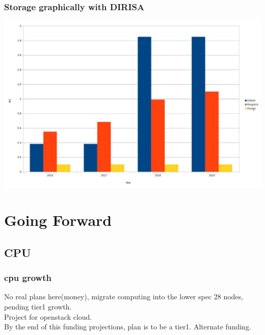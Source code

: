 \documentclass{beamer}
\begin{document}
\begin{frame}
    \frametitle{Storage graphically with DIRISA}
    \includegraphics[scale=0.25]{StoragePledge-WithDIRISA.jpg}
\end{frame}


\section{Going Forward}
\subsection{CPU}
\begin{frame}
    \frametitle{cpu growth}
    No real plans here(money), migrate computing into the lower spec 28 nodes, pending tier1 growth.\\
    Project for openstack cloud.\\
    By the end of this funding projections, plan is to be a tier1. Alternate funding.
\end{frame}
\end{document}
